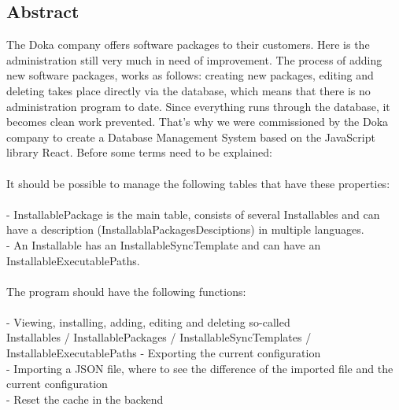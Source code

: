 \begin{spacing}{.5}
  \chapter*{Abstract}
\end{spacing}
The Doka company offers software packages to their customers. Here is the administration
still very much in need of improvement. The process of adding new software packages,
works as follows: creating new packages, editing and deleting
takes place directly via the database, which means that there is no administration program
to date. Since everything runs through the database, it becomes clean
work prevented. That's why we were commissioned by the Doka company to create a
Database Management System based on the JavaScript library React. 
Before some terms need to be explained:
\\
\\
It should be possible to manage the following tables that have these properties: 
\\
\\
- InstallablePackage is the main table, consists of several Installables and
can have a description (InstallablaPackagesDesciptions) in multiple languages. 
\\
- An Installable has an InstallableSyncTemplate and can have an InstallableExecutablePaths.
\\
\\
The program should have the following functions:
\\
\\
- Viewing, installing, adding, editing and deleting so-called
\\
Installables / InstallablePackages / InstallableSyncTemplates / InstallableExecutablePaths 
- Exporting the current configuration 
\\
- Importing a JSON file,
where to see the difference of the imported file and the current configuration 
\\
- Reset the cache in the backend

